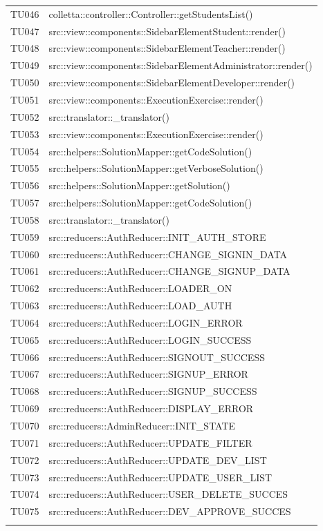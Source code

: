 \begin{tabularx}{\textwidth}{cX}
	TU046 & colletta::controller::Controller::getStudentsList() \\
	TU047 & src::view::components::SidebarElementStudent::render() \\
	TU048 & src::view::components::SidebarElementTeacher::render() \\
	TU049 &	src::view::components::SidebarElementAdministrator::render() \\
	TU050 &	src::view::components::SidebarElementDeveloper::render() \\
	TU051 &	src::view::components::ExecutionExercise::render() \\
	TU052 &	src::translator::\_translator() \\
	TU053 & src::view::components::ExecutionExercise::render() \\
	TU054 &	src::helpers::SolutionMapper::getCodeSolution() \\
	TU055 & src::helpers::SolutionMapper::getVerboseSolution() \\
	TU056 & src::helpers::SolutionMapper::getSolution() \\
	TU057 &	src::helpers::SolutionMapper::getCodeSolution() \\
	TU058 &	src::translator::\_translator() \\
	TU059 &	src::reducers::AuthReducer::INIT\_AUTH\_STORE \\
	TU060 &	src::reducers::AuthReducer::CHANGE\_SIGNIN\_DATA \\
	TU061 &	src::reducers::AuthReducer::CHANGE\_SIGNUP\_DATA \\
	TU062 &	src::reducers::AuthReducer::LOADER\_ON \\
	TU063 &	src::reducers::AuthReducer::LOAD\_AUTH \\
	TU064 &	src::reducers::AuthReducer::LOGIN\_ERROR \\
	TU065 &	src::reducers::AuthReducer::LOGIN\_SUCCESS \\
	TU066 &	src::reducers::AuthReducer::SIGNOUT\_SUCCESS \\
	TU067 &	src::reducers::AuthReducer::SIGNUP\_ERROR \\
	TU068 &	src::reducers::AuthReducer::SIGNUP\_SUCCESS \\
	TU069 &	src::reducers::AuthReducer::DISPLAY\_ERROR \\
	TU070 &	src::reducers::AdminReducer::INIT\_STATE \\
	TU071 &	src::reducers::AuthReducer::UPDATE\_FILTER \\
	TU072 &	src::reducers::AuthReducer::UPDATE\_DEV\_LIST \\
	TU073 &	src::reducers::AuthReducer::UPDATE\_USER\_LIST \\
	TU074 &	src::reducers::AuthReducer::USER\_DELETE\_SUCCES \\
	TU075 &	src::reducers::AuthReducer::DEV\_APPROVE\_SUCCES \\
	\rowcolor{white}
	\caption{Tracciamento test di unità - metodi}
	\label{tab:tracciamentotestunità}
\end{tabularx}

